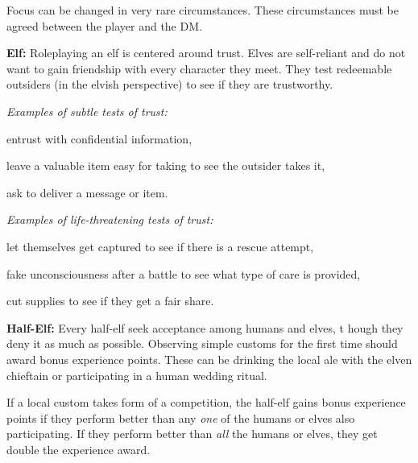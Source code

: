 Focus can be changed in very rare circumstances. These circumstances must be agreed between the player and the DM.


\textbf{Elf:} Roleplaying an elf is centered around trust. Elves are self-reliant and do not want to gain friendship with every character they meet. They test redeemable outsiders (in the elvish perspective) to see if they are trustworthy.

\textit{Examples of subtle tests of trust:}
\begin{itemize*}
	\item entrust with confidential information,
	\item leave a valuable item easy for taking to see the outsider takes it,
	\item ask to deliver a message or item.
\end{itemize*}

\textit{Examples of life-threatening tests of trust:}
\begin{itemize*}
	\item let themselves get captured to see if there is a rescue attempt,
	\item fake unconsciousness after a battle to see what type of care is provided,
	\item cut supplies to see if they get a fair share.
\end{itemize*}


\textbf{Half-Elf:} Every half-elf seek acceptance among humans and elves, t hough they deny it as much as possible. Observing simple customs for the first time should award bonus experience points. These can be drinking the local ale with the elven chieftain or participating in a human wedding ritual.

If a local custom takes form of a competition, the half-elf gains bonus experience points if they perform better than any \emph{one} of the humans or elves also participating. If they perform better than \emph{all} the humans or elves, they get double the experience award.

